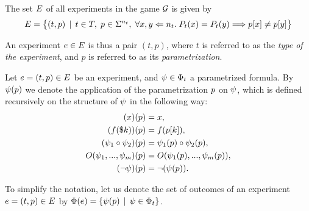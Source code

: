 The set $E$ of all experiments in the game $\mathcal{G}$ is given by
\[
  E =
     \big\{ (t, p) \:\:|\:\: t\in T,\; p \in\Sigma^{n_t},\;
     \forall x,y<={n_t}.\; P_t(x)=P_t(y) ==> p[x] \not= p[y] \big\}
\]

An experiment $e\in E$ is thus a pair $(t, p)$, where
  $t$ is referred to as the \emph{type of the experiment},
 and $p$ is referred to as its \emph{parametrization}.

Let $e = (t, p)\in E$ be an experiment,
  and $\psi\in\Phi_t$ a parametrized formula.
By $\psi(p)$ we denote the application of
  the parametrization $p$ on $\psi$,
  which is defined recursively on the structure of $\psi$
  in the following way:
\begin{align}
(x)(p) &= x, \\
(f(\$k))(p) &= f(p[k]),\\
(\psi_1\circ\psi_2)(p) &= \psi_1(p) \circ \psi_2(p),\\
O(\psi_1, ..., \psi_m)(p) &= O(\psi_1(p), ..., \psi_m(p)),\\
(\neg\psi)(p) &= \neg(\psi(p)).
\end{align}

To simplify the notation, let us denote the set of outcomes of
  an experiment $e = (t, p) \in E$ by
  $\Phi(e) = \{ \psi(p) \:\:|\:\: \psi\in\Phi_t\}$.

